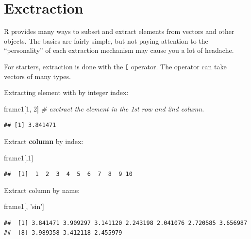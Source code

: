 \documentclass[]{book}
\newenvironment{Shaded}{\begin{snugshade}}{\end{snugshade}}
\newcommand{\CommentTok}[1]{\textcolor[rgb]{0.56,0.35,0.01}{\textit{#1}}}
\newcommand{\DecValTok}[1]{\textcolor[rgb]{0.00,0.00,0.81}{#1}}
\newcommand{\NormalTok}[1]{#1}
\newcommand{\StringTok}[1]{\textcolor[rgb]{0.31,0.60,0.02}{#1}}
\theoremstyle{definition}
\theoremstyle{definition}
\theoremstyle{definition}
\theoremstyle{remark}
\begin{document}
\hypertarget{exctraction}{%
\section{Exctraction}\label{exctraction}}

R provides many ways to subset and extract elements from vectors and other objects.
The basics are fairly simple, but not paying attention to the ``personality'' of each extraction mechanism may cause you a lot of headache.

For starters, extraction is done with the \texttt{{[}} operator.
The operator can take vectors of many types.

Extracting element with by integer index:

\begin{Shaded}
\begin{Highlighting}[]
\NormalTok{frame1[}\DecValTok{1}\NormalTok{, }\DecValTok{2}\NormalTok{]  }\CommentTok{# exctract the element in the 1st row and 2nd column.}
\end{Highlighting}
\end{Shaded}

\begin{verbatim}
## [1] 3.841471
\end{verbatim}

Extract \textbf{column} by index:

\begin{Shaded}
\begin{Highlighting}[]
\NormalTok{frame1[,}\DecValTok{1}\NormalTok{]                              }
\end{Highlighting}
\end{Shaded}

\begin{verbatim}
##  [1]  1  2  3  4  5  6  7  8  9 10
\end{verbatim}

Extract column by name:

\begin{Shaded}
\begin{Highlighting}[]
\NormalTok{frame1[, }\StringTok{'sin'}\NormalTok{]}
\end{Highlighting}
\end{Shaded}

\begin{verbatim}
##  [1] 3.841471 3.909297 3.141120 2.243198 2.041076 2.720585 3.656987
##  [8] 3.989358 3.412118 2.455979
\end{verbatim}
\end{document}
